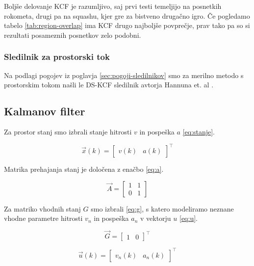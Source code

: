 Boljše delovanje KCF je razumljivo, saj prvi testi temeljijo na posnetkih rokometa, drugi pa na squashu, kjer gre za bistveno drugačno igro. Če pogledamo tabelo \ref{tab:region-overlap} ima KCF drugo najboljše povprečje, prav tako pa so si rezultati posameznih posnetkov zelo podobni. 


\subsubsection{Sledilnik za prostorski tok}
Na podlagi pogojev iz poglavja \ref{sec:pogoji-sledilnikov} smo za merilno metodo s prostorskim tokom našli le DS-KCF sledilnik avtorja Hannuna et. al \cite{hannuna2016ds}. 





\subsection{Kalmanov filter}
Za prostor stanj smo izbrali stanje hitrosti $v$ in pospeška $a$ \eqref{eq:stanje}. 

\begin{equation}
\vec{x}(k) = \begin{bmatrix}
					v(k) & a(k)
				\end{bmatrix}^\top 
                \label{eq:stanje}
\end{equation}

Matrika prehajanja stanj je določena z enačbo \eqref{eq:a}.

\begin{equation}
\vec{A} = \begin{bmatrix}
				1 & 1 \\
                0 & 1
			\end{bmatrix} 
            \label{eq:a}
\end{equation}

Za matriko vhodnih stanj $G$ smo izbrali \eqref{eq:g}, s katero modeliramo neznane vhodne parametre hitrosti $v_n$ in pospeška $a_n$ v vektorju $u$ \eqref{eq:u}. 

\begin{equation}
\vec{G} = \begin{bmatrix}
				1 & 0
			\end{bmatrix}^\top 
            \label{eq:g}
\end{equation}

\begin{equation}
\vec{u}(k) = \begin{bmatrix}
					v_{n}(k) & a_n(k)
				\end{bmatrix}^\top 
                \label{eq:u}
\end{equation}


